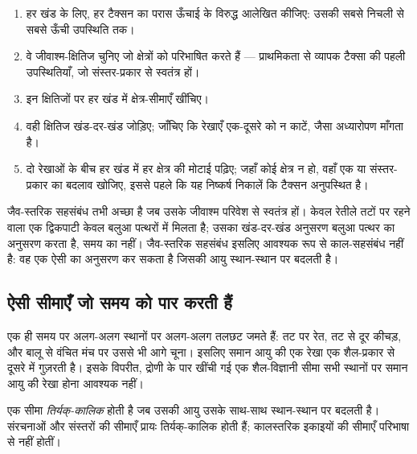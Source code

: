 \begin{method}[जैव-क्षेत्रों से खंडों का सहसंबंध]\label{met:b1:stratigraphic-scale:biozones}
\begin{enumerate}
  \item हर खंड के लिए, हर टैक्सन का परास ऊँचाई के विरुद्ध आलेखित कीजिए: उसकी सबसे निचली से सबसे ऊँची उपस्थिति तक।
  \item वे जीवाश्म-क्षितिज चुनिए जो क्षेत्रों को परिभाषित करते हैं --- प्राथमिकता से व्यापक टैक्सा की पहली उपस्थितियाँ, जो संस्तर-प्रकार से स्वतंत्र हों।
  \item इन क्षितिजों पर हर खंड में क्षेत्र-सीमाएँ खींचिए।
  \item वही क्षितिज खंड-दर-खंड जोड़िए; जाँचिए कि रेखाएँ एक-दूसरे को न काटें, जैसा अध्यारोपण माँगता है।
  \item दो रेखाओं के बीच हर खंड में हर क्षेत्र की मोटाई पढ़िए; जहाँ कोई क्षेत्र न हो, वहाँ एक  या संस्तर-प्रकार का बदलाव खोजिए, इससे पहले कि यह निष्कर्ष निकालें कि टैक्सन अनुपस्थित है।
\end{enumerate}
\end{method}

जैव-स्तरिक सहसंबंध तभी अच्छा है जब उसके जीवाश्म परिवेश से स्वतंत्र हों। केवल रेतीले तटों पर रहने वाला एक द्विकपाटी केवल बलुआ पत्थरों में मिलता है; उसका खंड-दर-खंड अनुसरण बलुआ पत्थर का अनुसरण करता है, समय का नहीं। जैव-स्तरिक सहसंबंध इसलिए आवश्यक रूप से काल-सहसंबंध नहीं है: वह एक ऐसी  का अनुसरण कर सकता है जिसकी आयु स्थान-स्थान पर बदलती है।

\subsection*{ऐसी सीमाएँ जो समय को पार करती हैं}

एक ही समय पर अलग-अलग स्थानों पर अलग-अलग तलछट जमते हैं: तट पर रेत, तट से दूर कीचड़, और बालू से वंचित मंच पर उससे भी आगे चूना। इसलिए समान आयु की एक रेखा एक शैल-प्रकार से दूसरे में गुज़रती है। इसके विपरीत, द्रोणी के पार खींची गई एक शैल-विज्ञानी सीमा सभी स्थानों पर समान आयु की रेखा होना आवश्यक नहीं।

\begin{definition}[तिर्यक्-कालिक सीमा]\label{def:b1:stratigraphic-scale:diachronous}
एक सीमा \emph{तिर्यक्-कालिक} होती है जब उसकी आयु उसके साथ-साथ स्थान-स्थान पर बदलती है। संरचनाओं और संस्तरों की सीमाएँ प्रायः तिर्यक्-कालिक होती हैं; कालस्तरिक इकाइयों की सीमाएँ परिभाषा से नहीं होतीं।
\end{definition}

